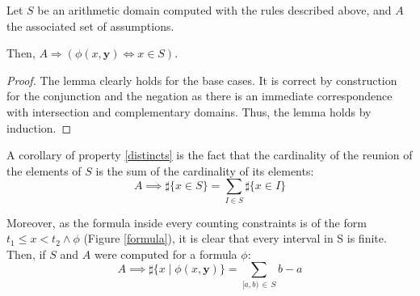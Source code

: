 








\begin{lemma}[Correctness]

Let $S$ be an arithmetic domain computed with the rules described above, and $A$ the associated set of assumptions.

Then,
$A \Rightarrow \left(\phi(x, \mathbf{y}) \iff x \in S\right)$.

\label{correctness-interpretation}

\end{lemma}

\begin{proof}
The lemma clearly holds for the base cases. It is correct by construction for the conjunction and the negation as there is an immediate correspondence with intersection and complementary domains.
Thus, the lemma holds by induction.
\end{proof}




A corollary of property \ref{distincts} is the fact that the cardinality of the reunion of the elements
of $S$ is the sum of the cardinality of its elements:
\begin{equation}
A \implies \sharp\{ x \in S \} = \sum\limits_{I \in S} \sharp\{x \in I\}
\end{equation}

Moreover, as the formula inside every counting constraints is of the form $t_1 \le x < t_2 \land
\phi$ (Figure \ref{formula}), it is clear that every interval in S is finite. Then, if $S$ and $A$
were computed for a formula $\phi$:
\begin{equation}
A \implies \sharp\{x \mid \phi(x, \mathbf{y})\} = \sum\limits_{[a, b)\, \in\, S} b - a
\end{equation}


